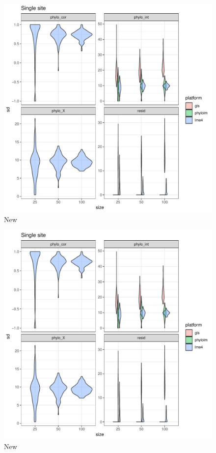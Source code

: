 \documentclass[12pt]{article}
\begin{document}
\begin{center}
\begin{figure}[h]
  \includegraphics[scale=0.8,page=2]{./git_push/plot.Rout.pdf}
  \caption{New}
\label{ssplot}
\end{figure}
\end{center}


\begin{center}
\begin{figure}[h]
  \includegraphics[scale=0.8,page=3]{./git_push/plot.Rout.pdf}
  \caption{New}
\label{ssplot}
\end{figure}
\end{center}
\end{document}
